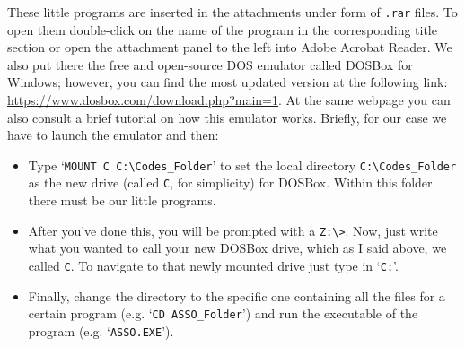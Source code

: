 These little programs are inserted in the attachments under form of \texttt{.rar} files. To open them double-click on the name of the program in the corresponding title section or open the attachment panel to the left into Adobe Acrobat Reader. We also put there the free and open-source DOS emulator called DOSBox  for Windows; however, you can find the most updated version at the following link: \url{https://www.dosbox.com/download.php?main=1}. At the same webpage you can also consult a brief tutorial on how this emulator works. Briefly, for our case we have to launch the emulator and then:
\begin{itemize}
\item Type `\texttt{MOUNT C C:\textbackslash Codes\_Folder}' to set the local directory \texttt{C:\textbackslash Codes\_Folder} as the new drive (called \texttt{C}, for simplicity) for DOSBox. Within this folder there must be our little programs.
\item After you've done this, you will be prompted with a \texttt{Z:\textbackslash >}. Now, just write what you wanted to call your new DOSBox drive, which as I said above, we called \texttt{C}. To navigate to that newly mounted drive just type in `\texttt{C:}'.
\item Finally, change the directory to the specific one containing all the files for a certain program (e.g. `\texttt{CD ASSO\_Folder}') and run the executable of the program (e.g. `\texttt{ASSO.EXE}').
\end{itemize}
